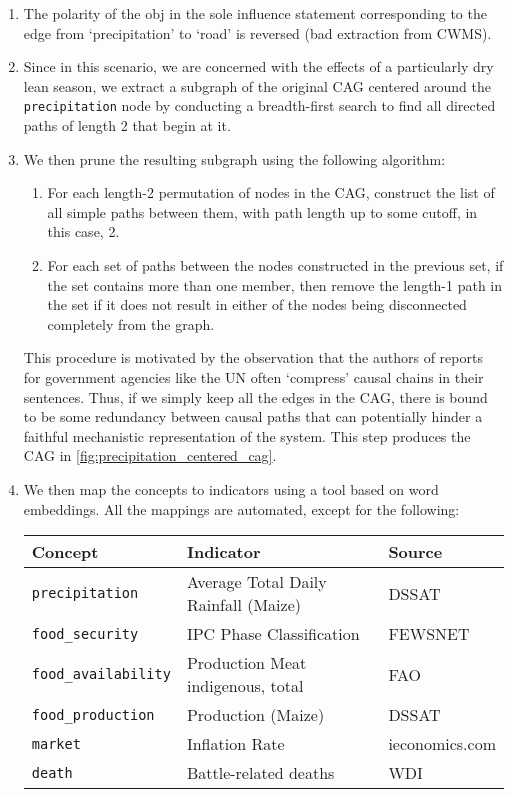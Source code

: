 \documentclass{apnotes}
\begin{document}
\begin{enumerate}
\item The polarity of the obj in the sole influence statement corresponding to
  the edge from `precipitation' to `road' is reversed (bad extraction from
  CWMS).

\item Since in this scenario, we are concerned with the effects of a
  particularly dry lean season, we extract a subgraph of the original CAG
  centered around the \texttt{precipitation} node by conducting a
  breadth-first search to find all directed paths of length 2 that begin at it.

\item We then prune the resulting subgraph using the following algorithm:
  \begin{enumerate}
    \item For each length-2 permutation of nodes in the CAG, construct the list
      of all simple paths between them, with path length up to some cutoff, in
      this case, 2.
    \item For each set of paths between the nodes constructed in the previous
      set, if the set contains more than one member, then remove the length-1
      path in the set if it does not result in either of the nodes being
      disconnected completely from the graph.
  \end{enumerate}

  This procedure is motivated by the observation that the authors of reports 
  for government agencies like the UN often `compress' causal chains in their
  sentences. Thus, if we simply keep all the edges in the CAG, there is bound to
  be some redundancy between causal paths that can potentially hinder a faithful
  mechanistic representation of the system. This step produces the CAG in
  \autoref{fig:precipitation_centered_cag}.

\item We then map the concepts to indicators using a tool based on word
  embeddings. All the mappings are automated, except for the following:
  
  \bigskip

  {\centering
  \begin{tabular}{lll}
    \toprule
    Concept                     & Indicator                            & Source\\
    \midrule
    \texttt{precipitation}      & Average Total Daily Rainfall (Maize) & DSSAT\\
    \texttt{food\_security}     & IPC Phase Classification             & FEWSNET\\
    \texttt{food\_availability} & Production Meat indigenous, total    & FAO\\
    \texttt{food\_production}   & Production (Maize)                   & DSSAT\\
    \texttt{market}             & Inflation Rate                       & ieconomics.com\\
    \texttt{death}              & Battle-related deaths                & WDI\\
    \bottomrule
  \end{tabular}
  }


\end{enumerate}
\end{document}
